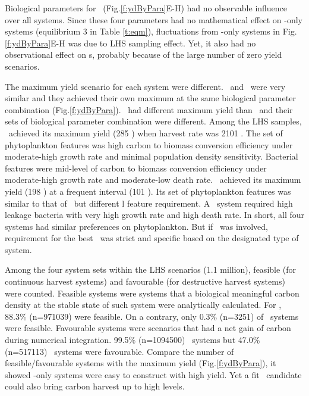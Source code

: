 \documentclass[../thesis.tex]{subfiles} %
\begin{document}
Biological parameters for \bac\ (Fig.\ref{f:ydByPara}E-H) had no observable influence over all systems.  Since these four parameters had no mathematical effect on \phy-only systems (equilibrium 3 in Table \ref{t:eqm}), fluctuations from \phy-only systems in Fig.\ref{f:ydByPara}E-H was due to LHS sampling effect.  Yet, it also had no observational effect on \pbs s, probably because of the large number of zero yield scenarios.

The maximum yield scenario for each system were different.  \PoH\ and \PoN\ were very similar and they achieved their own maximum at the same biological parameter combination (Fig.\ref{f:ydByPara}).  \PBH\ had different maximum yield than \PBN\ and their sets of biological parameter combination were different.  Among the LHS samples, \PBH\ achieved its maximum yield (285 \dxdt) when harvest rate was 2101 \dayU.  The set of phytoplankton features was high carbon to biomass conversion efficiency under moderate-high growth rate and minimal population density sensitivity.  Bacterial features were mid-level of carbon to biomass conversion efficiency under moderate-high growth rate and moderate-low death rate.  \PBN\ achieved its maximum yield (198 \dxdt) at a frequent interval (101 \dayU).  Its set of phytoplankton features was similar to that of \PBH\ but different \bac l feature requirement.  A \PBN\ system required high leakage bacteria with very high growth rate and high death rate.  In short, all four systems had similar preferences on phytoplankton.  But if \bac\ was involved, requirement for the best \bac\ was strict and specific based on the designated type of system.

Among the four system sets within the LHS scenarios (1.1 million), feasible (for continuous harvest systems) and favourable (for destructive harvest systems) were counted.  Feasible systems were systems that a biological meaningful carbon density at the stable state of such system were analytically calculated.  For \PoH, 88.3\% (n=971039) were feasible.  On a contrary, only 0.3\% (n=3251) of \PBH\ systems were feasible.  Favourable systems were scenarios that had a net gain of carbon during numerical integration.  99.5\% (n=1094500) \PoN\ systems but 47.0\% (n=517113) \PBN\ systems were favourable.  Compare the number of feasible/favourable systems with the maximum yield (Fig.\ref{f:ydByPara}), it showed \phy-only systems were easy to construct with high yield.  Yet a fit \bac\ candidate could also bring carbon harvest up to high levels.
\end{document}
